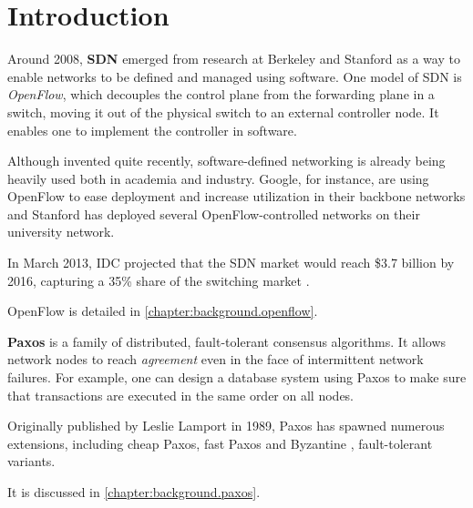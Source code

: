 \chapter{Introduction}

Around 2008, \textbf{\acf{SDN}}
\cite{Casado:2005:VNS:1047344.1047383} emerged from research at
Berkeley and
Stanford as a way to enable networks to be defined and managed using
software. One model of \acs{SDN} is \textit{OpenFlow}, which
decouples the control plane from the forwarding
plane in a
switch, moving it out of the physical switch to an external controller node.
It enables one to implement the controller in software.

Although invented quite recently, software-defined networking is already
being heavily used both in academia and industry.  Google, for instance, are
using OpenFlow to ease deployment and increase utilization in their backbone
networks \cite{crabbe2012sdn} and Stanford has deployed several
OpenFlow-controlled networks on their university network.

In March 2013, IDC  projected that the SDN market would
  reach \${}3.7 billion by 2016, capturing a 35\%{} share of the switching
  market \cite{Kirkpatrick:2013:SN:2500468.2500473}.

OpenFlow is detailed in \vref{chapter:background.openflow}.

\textbf{Paxos} \cite{Lamport:1998:PP:279227.279229} is a
family of distributed, fault-tolerant consensus algorithms.  It allows
network nodes to reach \textit{agreement} even in the face of intermittent
network failures.  For example, one can design a database system using Paxos
to make sure that transactions are executed in the same order on all nodes.

Originally published by Leslie Lamport in 1989, Paxos
has spawned numerous extensions, including cheap Paxos,
 fast Paxos
 and Byzantine
, fault-tolerant variants.

It is discussed in \vref{chapter:background.paxos}.

